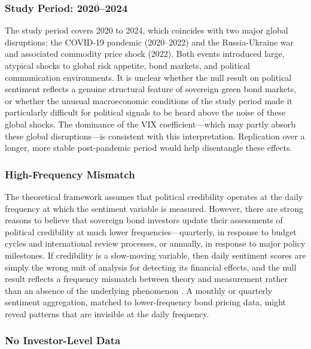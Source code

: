 \documentclass[12pt,a4paper]{article}
\begin{document}
\subsubsection{Study Period: 2020--2024}

The study period covers 2020 to 2024, which coincides with two major global disruptions: the COVID-19 pandemic (2020--2022) and the Russia-Ukraine war and associated commodity price shock (2022). Both events introduced large, atypical shocks to global risk appetite, bond markets, and political communication environments. It is unclear whether the null result on political sentiment reflects a genuine structural feature of sovereign green bond markets, or whether the unusual macroeconomic conditions of the study period made it particularly difficult for political signals to be heard above the noise of these global shocks. The dominance of the VIX coefficient---which may partly absorb these global disruptions---is consistent with this interpretation. Replication over a longer, more stable post-pandemic period would help disentangle these effects.

\subsubsection{High-Frequency Mismatch}

The theoretical framework assumes that political credibility operates at the daily frequency at which the sentiment variable is measured. However, there are strong reasons to believe that sovereign bond investors update their assessments of political credibility at much lower frequencies---quarterly, in response to budget cycles and international review processes, or annually, in response to major policy milestones. If credibility is a slow-moving variable, then daily sentiment scores are simply the wrong unit of analysis for detecting its financial effects, and the null result reflects a frequency mismatch between theory and measurement rather than an absence of the underlying phenomenon \citep{Baker2019}. A monthly or quarterly sentiment aggregation, matched to lower-frequency bond pricing data, might reveal patterns that are invisible at the daily frequency.

\subsubsection{No Investor-Level Data}
\end{document}
